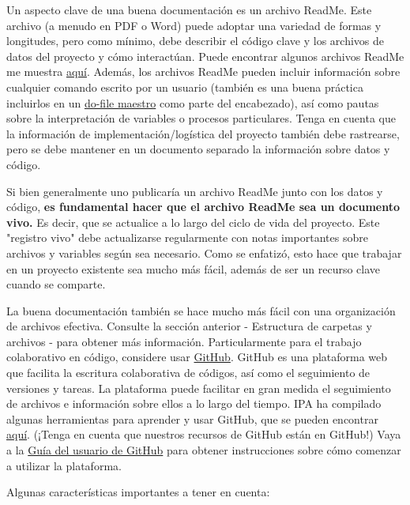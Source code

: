 \documentclass[11pt,en]{elegantpaper}
\begin{document}
Un aspecto clave de una buena documentación es un archivo ReadMe. Este archivo (a menudo en PDF o Word) puede adoptar una variedad de formas y longitudes, pero como mínimo, debe describir el código clave y los archivos de datos del proyecto y cómo interactúan. Puede encontrar algunos archivos ReadMe me muestra \href{http://www.poverty-action.org/research-transparency/example-readme-files}{aquí}. Además, los archivos ReadMe pueden incluir información sobre cualquier comando escrito por un usuario (también es una buena práctica incluirlos en un \href{http://www.poverty-action.org/research-transparency/example-master}{do-file maestro} como parte del encabezado), así como pautas sobre la interpretación de variables o procesos particulares. Tenga en cuenta que la información de implementación/logística del proyecto también debe rastrearse, pero se debe mantener en un documento separado la información sobre datos y código.

Si bien generalmente uno publicaría un archivo ReadMe junto con los datos y código, \textbf{es fundamental hacer que el archivo ReadMe sea un documento vivo.} Es decir, que se actualice a lo largo del ciclo de vida del proyecto. Este "registro vivo" debe actualizarse regularmente con notas importantes sobre archivos y variables según sea necesario. Como se enfatizó, esto hace que trabajar en un proyecto existente sea mucho más fácil, además de ser un recurso clave cuando se comparte.

La buena documentación también se hace mucho más fácil con una organización de archivos efectiva. Consulte la sección anterior - Estructura de carpetas y archivos - para obtener más información. Particularmente para el trabajo colaborativo en código, considere usar \href{https://github.com/}{GitHub}. GitHub es una plataforma web que facilita la escritura colaborativa de códigos, así como el seguimiento de versiones y tareas. La plataforma puede facilitar en gran medida el seguimiento de archivos e información sobre ellos a lo largo del tiempo. IPA ha compilado algunas herramientas para aprender y usar GitHub, que se pueden encontrar \href{https://github.com/PovertyAction/github-training}{aquí}. (¡Tenga en cuenta que nuestros recursos de GitHub están en GitHub!) Vaya a la \href{https://github.com/PovertyAction/github-training/blob/master/resources/GitHub\%20User\%20Guide.md}{Guía del usuario de GitHub} para obtener instrucciones sobre cómo comenzar a utilizar la plataforma.

Algunas características importantes a tener en cuenta:
\end{document}
